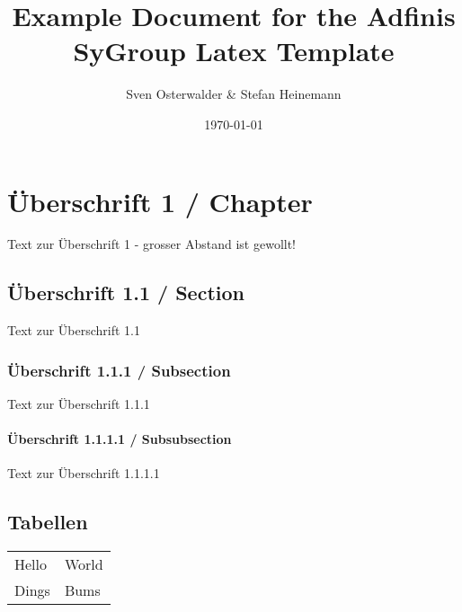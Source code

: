 \documentclass[oneside]{report}
\title{Example Document for the Adfinis SyGroup Latex Template}
\author{Sven Osterwalder \& Stefan Heinemann}
\date{\today}
\begin{document}
\maketitle{}
%

\tableofcontents{}

\chapter{Überschrift 1 / Chapter}

Text zur Überschrift 1 - grosser Abstand ist gewollt!

\section{Überschrift 1.1 / Section}

Text zur Überschrift 1.1

\subsection{Überschrift 1.1.1 / Subsection}

Text zur Überschrift 1.1.1

\subsubsection{Überschrift 1.1.1.1 / Subsubsection}

Text zur Überschrift 1.1.1.1


\section{Tabellen}

\begin{tabulary}{\linewidth}{l  | l}
	Hello & World \\
	Dings & Bums \\
\end{tabulary}
\end{document}
